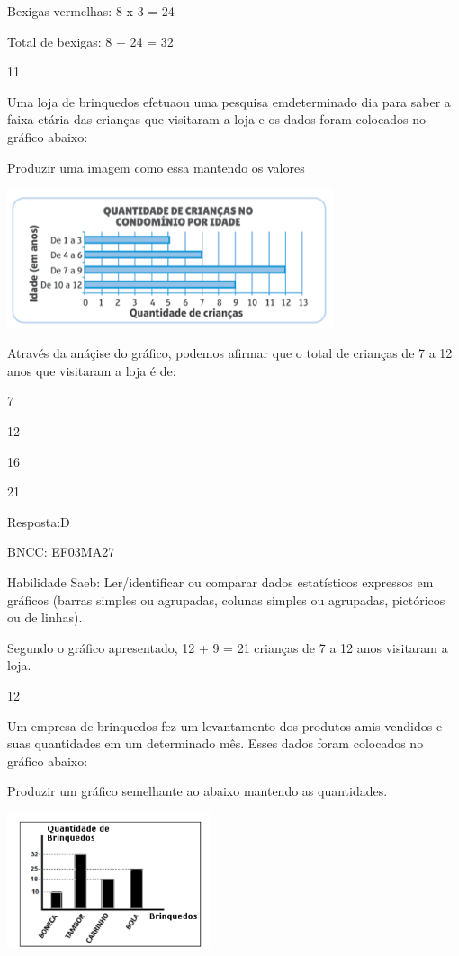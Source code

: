 \begin{escolha}
{\begin{escolha}
{Bexigas vermelhas: 8 x 3 = 24

Total de bexigas: 8 + 24 = 32

\num{11}

Uma loja de brinquedos efetuaou uma pesquisa emdeterminado dia para
saber a faixa etária das crianças que visitaram a loja e os dados foram
colocados no gráfico abaixo:

Produzir uma imagem como essa mantendo os valores

\includegraphics[width=3.77564in,height=1.60972in]{media/image136.png}

Através da anáçise do gráfico, podemos afirmar que o total de crianças
de 7 a 12 anos que visitaram a loja é de:

\begin{escolha}

\item
  7
\item
  12
\item
  16
\item
  21
\end{escolha}

Resposta:D

BNCC: EF03MA27

Habilidade Saeb: Ler/identificar ou comparar dados estatísticos
expressos em gráficos (barras simples ou agrupadas, colunas simples ou
agrupadas, pictóricos ou de linhas).

Segundo o gráfico apresentado, 12 + 9 = 21 crianças de 7 a 12 anos
visitaram a loja.

\num{12}

Um empresa de brinquedos fez um levantamento dos produtos amis vendidos
e suas quantidades em um determinado mês. Esses dados foram colocados no
gráfico abaixo:

Produzir um gráfico semelhante ao abaixo mantendo as quantidades.

\includegraphics[width=2.35294in,height=1.56863in]{media/image137.png}

}
\end{escolha}}
\end{escolha}
